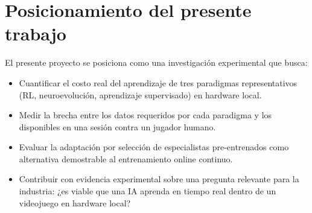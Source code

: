\section{Posicionamiento del presente trabajo}

El presente proyecto se posiciona como una investigación experimental que busca:

\begin{itemize}
    \item Cuantificar el costo real del aprendizaje de tres paradigmas representativos (RL, neuroevolución, aprendizaje supervisado) en hardware local.
    \item Medir la brecha entre los datos requeridos por cada paradigma y los disponibles en una sesión contra un jugador humano.
    \item Evaluar la adaptación por selección de especialistas pre-entrenados como alternativa demostrable al entrenamiento online continuo.
    \item Contribuir con evidencia experimental sobre una pregunta relevante para la industria: ¿es viable que una IA aprenda en tiempo real dentro de un videojuego en hardware local?
\end{itemize}
